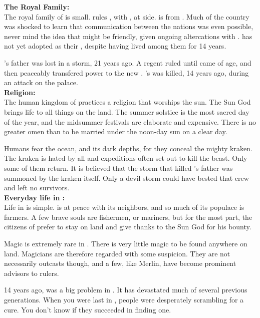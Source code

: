 \documentclass[blue]{NeptuneBall}
\begin{document}
\name{\bHumanShort{}}

{\bf The Royal Family:}\\
The royal family of \pAmerica{} is small. \cEric{\King} \cEric{} rules \pAmerica{}, with \cEric{\their} \cAriel{\spouse}, \cAriel{\King} \cAriel{} at \cEric{\their} side. \cAriel{} is from \pAtlantis{}. Much of the country was shocked to learn that communication between the nations was even possible, never mind the idea that \pAtlantis{} might be friendly, given ongoing altercations with \pPacifica{}. \pAmerica{} has not yet adopted \cAriel{} as their \cAriel{\King}, despite \cAriel{\their} having lived among them for 14 years.

\cEric{}'s father was lost in a storm, 21 years ago. A regent ruled until \cEric{} came of age, and then peaceably transfered power to the new \cEric{\King}. \cEric{}'s \cSlave{\sibling} was killed, 14 years ago, during an attack on the palace.\\

{\bf Religion:}\\
The human kingdom of \pAmerica{} practices a religion that worships the sun. The Sun God brings life to all things on the land. The summer solstice is the most sacred day of the year, and the midsummer festivals are elaborate and expensive. There is no greater omen than to be married under the noon-day sun on a clear day.

Humans fear the ocean, and its dark depths, for they conceal the mighty kraken. The kraken is hated by all and expeditions often set out to kill the beast. Only some of them return. It is believed that the storm that killed \cEric{}'s father was summoned by the kraken itself. Only a devil storm could have bested that crew and left no survivors.\\

{\bf Everyday life in \pAmerica{}:}\\
Life in \pAmerica{} is simple. \pAmerica{} is at peace with its neighbors, and so much of its populace is farmers. A few brave souls are fishermen, or mariners,  but for the most part, the citizens of \pAmerica{} prefer to stay on land and give thanks to the Sun God for his bounty.

Magic is extremely rare in \pAmerica{}. There is very little magic to be found anywhere on land. Magicians are therefore regarded with some suspicion. They are not necessarily outcasts though, and a few, like Merlin, have become prominent advisors to rulers.

14 years ago, \cPolio{} was a big problem in \pAmerica{}. It has devastated much of several previous generations. When you were last in \pAmerica{}, people were desperately scrambling for a cure. You don't know if they succeeded in finding one.
\end{document}
